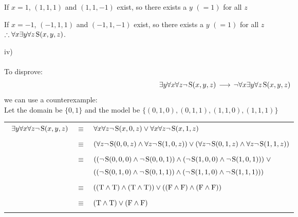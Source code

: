 \documentclass{article}
\newcommand{\True}{\textnormal{T}}
\newcommand{\False}{\textnormal{F}}
\newcommand{\predS}{\hspace{0.05cm} \textnormal{S}}
\newcommand{\predicate}{\predS (x,y,z)}
\newcommand{\impgap}{\hspace{0.05cm}}
\newcommand{\imp}{\impgap \longrightarrow \impgap}
\begin{document}
\begin{enumerate}
{{    \hspace{1.13cm} If $x=1$, $(1,1,1)$ and $(1,1,-1)$ exist, so there exists a $y$ $(=1)$ for all $z$
    
    \hspace{1.13cm} If $x=-1$, $(-1,1,1)$ and $(-1,1,-1)$ exist, so there exists a $y$ $(=1)$ for all $z$ \\

    \hspace{0.5cm} $\therefore \forall x \exists y \forall z \predicate$.
    }
    
    }

    \pagebreak

    iv) \\ \\
    {
    To disprove:
    $$\exists y \forall x \forall z \lnot \predicate \imp \lnot \forall x \exists y \forall z \predicate$$
    we can use a counterexample: \\

    Let the domain be $\{0, 1\}$ and the model be $\{(0,1,0), (0,1,1), (1,1,0), (1,1,1)\}$
    }
    {
    \begin{center}\begin{tabular}{ccl}\
   $\exists y \forall x \forall z \lnot \predicate$ & $\equiv$ & $\forall x \forall z \lnot \predS(x,0,z) \lor \forall x \forall z \lnot \predS(x,1,z)$ \\ \\
    
    & $\equiv$ & $(\forall z \lnot \predS(0,0,z) \land \forall z \lnot \predS(1,0,z)) \lor (\forall z \lnot \predS(0,1,z) \land \forall z \lnot \predS(1,1,z))$ \\ \\
    
    & $\equiv$ & $((\lnot \predS(0,0,0) \land \lnot \predS(0,0,1)) \land (\lnot \predS(1,0,0) \land \lnot \predS(1,0,1))) \hspace{0.1cm} \lor$ \\
    & & $((\lnot \predS(0,1,0) \land \lnot \predS(0,1,1)) \land (\lnot \predS(1,1,0) \land \lnot \predS(1,1,1)))$ \\ \\
    
    & $\equiv$ & $((\True \land \True) \land (\True \land \True)) \lor ((\False \land \False) \land (\False \land \False))$ \\ \\
    
    & $\equiv$ & $(\True \land \True) \lor (\False \land \False)$ \\ \\
    

\end{tabular}
\end{center}}
\end{enumerate}
\end{document}
